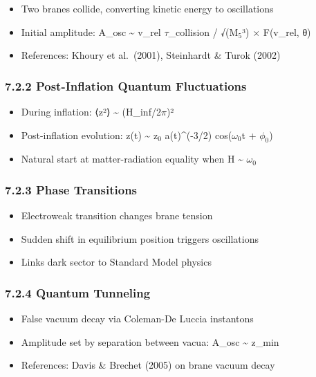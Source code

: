 \documentclass[
  11pt,
]{report}
\providecommand{\tightlist}{%
  \setlength{\itemsep}{0pt}\setlength{\parskip}{0pt}}
\begin{document}
\begin{itemize}
\tightlist
\item
  Two branes collide, converting kinetic energy to oscillations
\item
  Initial amplitude: A\_osc \textasciitilde{} v\_rel \(\tau\)\_collision
  / √(M\(_5\)³) × F(v\_rel, θ)
\item
  References: Khoury et al.~(2001), Steinhardt \& Turok (2002)
\end{itemize}

\subsubsection{7.2.2 Post-Inflation Quantum
Fluctuations}\label{post-inflation-quantum-fluctuations}

\begin{itemize}
\tightlist
\item
  During inflation: ⟨z²⟩ \textasciitilde{} (H\_inf/2\(\pi\))²
\item
  Post-inflation evolution: z(t) \textasciitilde{} z\(_0\)
  a(t)\^{}(-3/2) cos(\(\omega_0\)t + \(\phi_0\))
\item
  Natural start at matter-radiation equality when H \textasciitilde{}
  \(\omega_0\)
\end{itemize}

\subsubsection{7.2.3 Phase Transitions}\label{phase-transitions}

\begin{itemize}
\tightlist
\item
  Electroweak transition changes brane tension
\item
  Sudden shift in equilibrium position triggers oscillations
\item
  Links dark sector to Standard Model physics
\end{itemize}

\subsubsection{7.2.4 Quantum Tunneling}\label{quantum-tunneling}

\begin{itemize}
\tightlist
\item
  False vacuum decay via Coleman-De Luccia instantons
\item
  Amplitude set by separation between vacua: A\_osc \textasciitilde{}
  z\_min
\item
  References: Davis \& Brechet (2005) on brane vacuum decay
\end{itemize}
\end{document}
